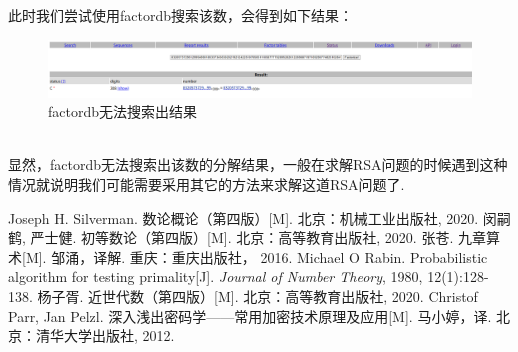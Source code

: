 \documentclass{article}
\numberwithin{equation}{subsubsection}
\begin{document}
此时我们尝试使用factordb搜索该数，会得到如下结果：\\
\begin{figure}[h!]
    \centering
    \includegraphics[width=1\textwidth]{Picture/factordb_factor_not_found.png}
    \caption{factordb无法搜索出结果}
\end{figure}\\
显然，factordb无法搜索出该数的分解结果，一般在求解RSA问题的时候遇到这种情况就说明我们可能需要采用其它的方法来求解这道RSA问题了.\par

\newpage
\begin{thebibliography}{99}
     Joseph H. Silverman. 数论概论（第四版）[M]. 北京：机械工业出版社, 2020.
     闵嗣鹤, 严士健. 初等数论（第四版）[M]. 北京：高等教育出版社, 2020.  
     张苍. 九章算术[M]. 邹涌，译解. 重庆：重庆出版社， 2016.
     Michael O Rabin. Probabilistic algorithm for testing primality[J]. \textit{Journal of Number Theory}, 1980, 12(1):128-138.
     杨子胥. 近世代数（第四版）[M]. 北京：高等教育出版社, 2020.
     Christof Parr, Jan Pelzl. 深入浅出密码学——常用加密技术原理及应用[M]. 马小婷，译. 北京：清华大学出版社, 2012.
\end{thebibliography}
\end{document}
